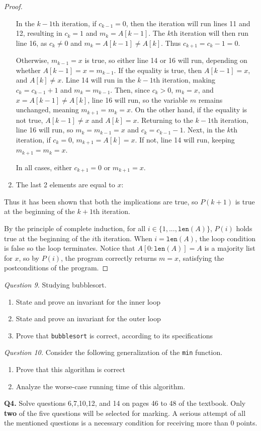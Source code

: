 \documentclass[11pt]{article}
\begin{document}
\begin{proof}
\begin{enumerate}
            In the \(k-1\)th iteration, if \(c_{k-1} = 0\), then the iteration will run lines 11 and 12, resulting in \(c_k = 1\) and \(m_k = A[k-1]\). The \(k\)th iteration will then run line 16, as \(c_k \neq 0\) and \(m_k = A[k-1] \neq A[k]\). Thus \(c_{k+1} = c_k - 1 = 0\).

            Otherwise, \(m_{k-1} = x\) is true, so either line 14 or 16 will run, depending on whether \(A[k-1]=x=m_{k-1}\). If the equality is true, then \(A[k-1] = x\), and \(A[k] \neq x\). Line 14 will run in the \(k-1\)th iteration, making \(c_k = c_{k-1} + 1\) and \(m_k = m_{k-1}\). Then, since \(c_k > 0\), \(m_k = x\), and \(x=A[k-1]\neq A[k]\), line 16 will run, so the variable \(m\) remains unchanged, meaning \(m_{k+1} = m_k = x\). On the other hand, if the equality is not true, \(A[k-1] \neq x\) and \(A[k] = x\). Returning to the \(k-1\)th iteration, line 16 will run, so \(m_k = m_{k-1} = x\) and \(c_k = c_{k-1} - 1\). Next, in the \(k\)th iteration, if \(c_k =  0\), \(m_{k+1} = A[k] = x\). If not, line 14 will run, keeping \(m_{k+1} = m_k = x\).

            In all cases, either \(c_{k+1} = 0\) or \(m_{k+1} = x\).

            \item The last 2 elements are equal to \(x\):
        \end{enumerate}
        Thus it has been shown that both the implications are true, so \(P(k+1)\) is true at the beginning of the \(k+1\)th iteration.

        By the principle of complete induction, for all \(i \in \{1,...,\texttt{len}(A)\}\), \(P(i)\) holds true at the beginning of the \(i\)th iteration. When \(i = \texttt{len}(A)\), the loop condition is false so the loop terminates. Notice that \(A[0:\texttt{len}(A)] = A\) is a majority list for \(x\), so by \(P(i)\), the program correctly returns \(m = x\), satisfying the postconditions of the program.
        
    \end{proof}
    \textit{Question 9.} Studying bubblesort.
    \begin{enumerate}[label=(\alph*)]
        \item State and prove an invariant for the inner loop
        \item State and prove an invariant for the outer loop
        \item Prove that \verb|bubblesort| is correct, according to its specifications
    \end{enumerate}
    \textit{Question 10.} Consider the following generalization of the \verb|min| function.
    \begin{enumerate}[label=(\alph*)]
        \item Prove that this algorithm is correct
        \item Analyze the worse-case running time of this algorithm.
    \end{enumerate}
    \pagebreak
    \textbf{Q4.} Solve questions 6,7,10,12, and 14 on pages 46 to 48 of the textbook. Only \textbf{two} of the five questions will be selected for marking. A serious attempt of all the mentioned questions is a necessary condition for receiving more than 0 points.
\end{document}

